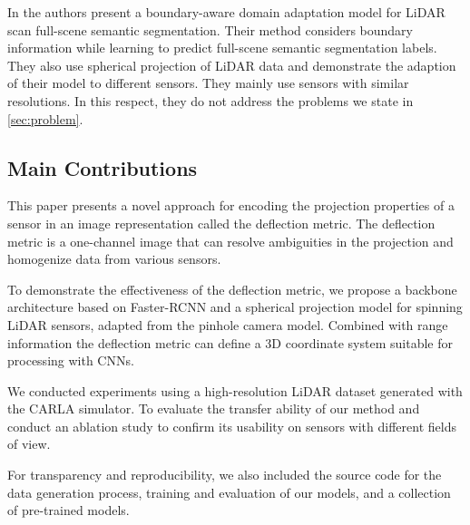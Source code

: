 In \cite{LiDARNet} the authors present a boundary-aware domain adaptation
model for LiDAR scan full-scene semantic segmentation. Their method considers boundary information while learning to predict full-scene semantic segmentation labels. They also use spherical projection of LiDAR data and demonstrate the adaption of their model to different sensors. They mainly use sensors with similar resolutions. In this respect, they do not address the problems we state in \autoref{sec:problem}. 

\subsection{Main Contributions} \label{sec_contrib}
This paper presents a novel approach for encoding the projection properties of a sensor in an image representation called the deflection metric. The deflection metric is a one-channel image that can resolve ambiguities in the projection and homogenize data from various sensors.

To demonstrate the effectiveness of the deflection metric, we propose a backbone architecture based on Faster-RCNN and a spherical projection model for spinning LiDAR sensors, adapted from the pinhole camera model. Combined with range information the deflection metric can define a 3D coordinate system suitable for processing with CNNs.

We conducted experiments using a high-resolution LiDAR dataset generated with the CARLA \cite{Dosovitskiy17} simulator. To evaluate the transfer ability of our method and conduct an ablation study to confirm its usability on sensors with different fields of view.

For transparency and reproducibility, we also included the source code for the data generation process, training and evaluation of our models, and a collection of pre-trained models.
